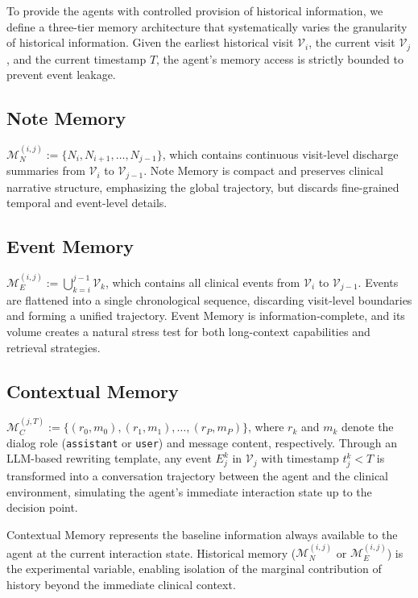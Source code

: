 To provide the agents with controlled provision of historical information, we define a three-tier memory architecture that systematically varies the granularity of historical information. Given the earliest historical visit $\mathcal{V}_i$, the current visit $\mathcal{V}_j$, and the current timestamp $T$, the agent's memory access is strictly bounded to prevent event leakage.

\subsection{Note Memory}
\label{sec:notemem}

$\mathcal{M}^{(i,j)}_N := \{N_i, N_{i+1}, \dots, N_{j-1}\}$, which contains continuous visit-level discharge summaries from $\mathcal{V}_i$ to $\mathcal{V}_{j-1}$. Note Memory is compact and preserves clinical narrative structure, emphasizing the global trajectory, but discards fine-grained temporal and event-level details.

\subsection{Event Memory}
\label{sec:eventmem}

$\mathcal{M}^{(i,j)}_E := \bigcup_{k=i}^{j-1} \mathcal{V}_k$, which contains all clinical events from $\mathcal{V}_i$ to $\mathcal{V}_{j-1}$. Events are flattened into a single chronological sequence, discarding visit-level boundaries and forming a unified trajectory. Event Memory is information-complete, and its volume creates a natural stress test for both long-context capabilities and retrieval strategies.

\subsection{Contextual Memory}
\label{sec:contextmem}

$\mathcal{M}_C^{(j,T)} := \{(r_0, m_0), (r_1, m_1), \dots, (r_P, m_P)\}$, where $r_k$ and $m_k$ denote the dialog role (\texttt{assistant} or \texttt{user}) and message content, respectively. Through an LLM-based rewriting template, any event $E_j^k$ in $\mathcal{V}_j$ with timestamp $t_j^k < T$ is transformed into a conversation trajectory between the agent and the clinical environment, simulating the agent's immediate interaction state up to the decision point.

Contextual Memory represents the baseline information always available to the agent at the current interaction state. Historical memory ($\mathcal{M}^{(i,j)}_N$ or $\mathcal{M}^{(i,j)}_E$) is the experimental variable, enabling isolation of the marginal contribution of history beyond the immediate clinical context.

